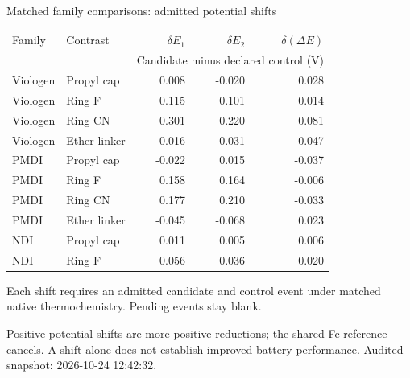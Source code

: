 \begin{frame}{Matched family comparisons: admitted potential shifts}
\scriptsize\centering\renewcommand{\arraystretch}{1.15}
\begin{tabular}{@{}llrrr@{}}\toprule
Family & Contrast & $\delta E_1$ & $\delta E_2$ & $\delta(\Delta E)$ \\
& & \multicolumn{3}{c}{Candidate minus declared control (V)} \\ \midrule
Viologen & Propyl cap & 0.008 & -0.020 & 0.028 \\
Viologen & Ring F & 0.115 & 0.101 & 0.014 \\
Viologen & Ring CN & 0.301 & 0.220 & 0.081 \\
Viologen & Ether linker & 0.016 & -0.031 & 0.047 \\
PMDI & Propyl cap & -0.022 & 0.015 & -0.037 \\
PMDI & Ring F & 0.158 & 0.164 & -0.006 \\
PMDI & Ring CN & 0.177 & 0.210 & -0.033 \\
PMDI & Ether linker & -0.045 & -0.068 & 0.023 \\
NDI & Propyl cap & 0.011 & 0.005 & 0.006 \\
NDI & Ring F & 0.056 & 0.036 & 0.020 \\
\bottomrule\end{tabular}\par\vspace{1ex}\raggedright
\footnotesize Each shift requires an admitted candidate and control event under matched native thermochemistry. Pending events stay blank.
\par\vspace{1ex}Positive potential shifts are more positive reductions; the shared Fc reference cancels. A shift alone does not establish improved battery performance.
\vfill\scriptsize Audited snapshot: 2026-10-24 12:42:32.
\end{frame}
